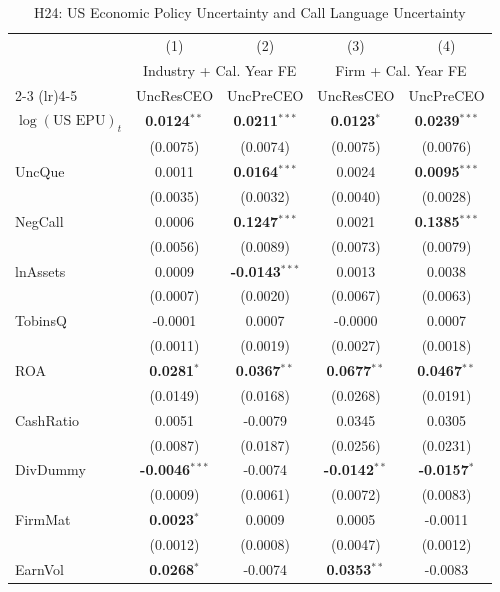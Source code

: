 \begin{landscape}
\begin{table}[H]
\setlength{\tabcolsep}{3pt}
\renewcommand{\arraystretch}{0.85}
\centering
\caption{H24: US Economic Policy Uncertainty and Call Language Uncertainty}
\label{tab:h24_us_epu}
\scriptsize
\begin{tabular}{lcccc}
\toprule
 & (1) & (2) & (3) & (4) \\
 & \multicolumn{2}{c}{Industry + Cal. Year FE} & \multicolumn{2}{c}{Firm + Cal. Year FE} \\
\cmidrule(lr){2-3} \cmidrule(lr){4-5}
 & UncResCEO & UncPreCEO & UncResCEO & UncPreCEO \\
\midrule
$\log(\text{US EPU})_{t}$ & \textbf{0.0124}$^{**}$ & \textbf{0.0211}$^{***}$ & \textbf{0.0123}$^{*}$ & \textbf{0.0239}$^{***}$ \\
 & (0.0075) & (0.0074) & (0.0075) & (0.0076) \\
\midrule
UncQue & 0.0011 & \textbf{0.0164}$^{***}$ & 0.0024 & \textbf{0.0095}$^{***}$ \\
 & (0.0035) & (0.0032) & (0.0040) & (0.0028) \\
NegCall & 0.0006 & \textbf{0.1247}$^{***}$ & 0.0021 & \textbf{0.1385}$^{***}$ \\
 & (0.0056) & (0.0089) & (0.0073) & (0.0079) \\
lnAssets & 0.0009 & \textbf{-0.0143}$^{***}$ & 0.0013 & 0.0038 \\
 & (0.0007) & (0.0020) & (0.0067) & (0.0063) \\
TobinsQ & -0.0001 & 0.0007 & -0.0000 & 0.0007 \\
 & (0.0011) & (0.0019) & (0.0027) & (0.0018) \\
ROA & \textbf{0.0281}$^{*}$ & \textbf{0.0367}$^{**}$ & \textbf{0.0677}$^{**}$ & \textbf{0.0467}$^{**}$ \\
 & (0.0149) & (0.0168) & (0.0268) & (0.0191) \\
CashRatio & 0.0051 & -0.0079 & 0.0345 & 0.0305 \\
 & (0.0087) & (0.0187) & (0.0256) & (0.0231) \\
DivDummy & \textbf{-0.0046}$^{***}$ & -0.0074 & \textbf{-0.0142}$^{**}$ & \textbf{-0.0157}$^{*}$ \\
 & (0.0009) & (0.0061) & (0.0072) & (0.0083) \\
FirmMat & \textbf{0.0023}$^{*}$ & 0.0009 & 0.0005 & -0.0011 \\
 & (0.0012) & (0.0008) & (0.0047) & (0.0012) \\
EarnVol & \textbf{0.0268}$^{*}$ & -0.0074 & \textbf{0.0353}$^{**}$ & -0.0083 \\

\end{tabular}
\end{table}
\end{landscape}
